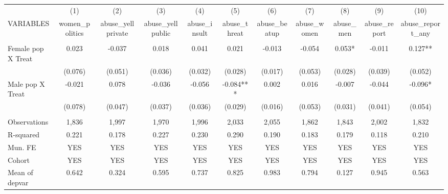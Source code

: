 \begin{tabular}{lcccccccccc} \hline
 & (1) & (2) & (3) & (4) & (5) & (6) & (7) & (8) & (9) & (10) \\
VARIABLES & women\_politics & abuse\_yellprivate & abuse\_yellpublic & abuse\_insult & abuse\_threat & abuse\_beatup & abuse\_women & abuse\_men & abuse\_report & abuse\_report\_any \\ \hline
 &  &  &  &  &  &  &  &  &  &  \\
Female pop X Treat & 0.023 & -0.037 & 0.018 & 0.041 & 0.021 & -0.013 & -0.054 & 0.053* & -0.011 & 0.127** \\
 & (0.076) & (0.051) & (0.036) & (0.032) & (0.028) & (0.017) & (0.053) & (0.028) & (0.039) & (0.052) \\
Male pop X Treat & -0.021 & 0.078 & -0.036 & -0.056 & -0.084*** & 0.002 & 0.016 & -0.007 & -0.044 & -0.096* \\
 & (0.078) & (0.047) & (0.037) & (0.036) & (0.029) & (0.016) & (0.053) & (0.031) & (0.041) & (0.054) \\
 &  &  &  &  &  &  &  &  &  &  \\
Observations & 1,836 & 1,997 & 1,970 & 1,996 & 2,033 & 2,055 & 1,862 & 1,843 & 2,002 & 1,832 \\
R-squared & 0.221 & 0.178 & 0.227 & 0.230 & 0.290 & 0.190 & 0.183 & 0.179 & 0.118 & 0.210 \\
Mun. FE & YES & YES & YES & YES & YES & YES & YES & YES & YES & YES \\
Cohort & YES & YES & YES & YES & YES & YES & YES & YES & YES & YES \\
 Mean of depvar & 0.642 & 0.324 & 0.595 & 0.737 & 0.825 & 0.983 & 0.794 & 0.127 & 0.945 & 0.563 \\ \hline
\end{tabular}
